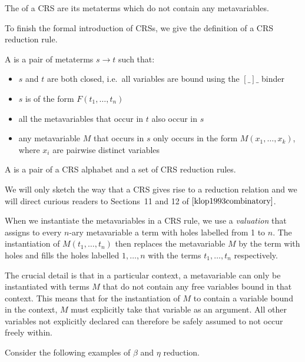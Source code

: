 \begin{definition}
  The  of a CRS are its metaterms which do not contain any
  metavariables.
\end{definition}

To finish the formal introduction of CRSs, we give the definition of a CRS
reduction rule.

\begin{definition}
  A  is a pair of metaterms $s \to t$ such that:
  \begin{itemize}
  \item $s$ and $t$ are both closed, i.e.\ all variables are bound using
    the $[\_]\_$ binder
  \item $s$ is of the form $F(t_1,\ldots,t_n)$
  \item all the metavariables that occur in $t$ also occur in $s$
  \item any metavariable $M$ that occurs in $s$ only occurs in the form
    $M(x_1,\ldots,x_k)$, where $x_i$ are pairwise distinct variables
  \end{itemize}
\end{definition}

\begin{definition}
  A  is a pair of a CRS alphabet
  and a set of CRS reduction rules.
\end{definition}

We will only sketch the way that a CRS gives rise to a reduction relation
and we will direct curious readers to Sections~11 and 12 of
$\cite{klop1993combinatory}$.

When we instantiate the metavariables in a CRS rule, we use a
\emph{valuation} that assigns to every $n$-ary metavariable a term with
holes labelled from 1 to $n$. The instantiation of $M(t_1,\ldots,t_n)$ then
replaces the metavariable $M$ by the term with holes and fills the holes
labelled $1,\ldots,n$ with the terms $t_1,\ldots,t_n$ respectively.

The crucial detail is that in a particular context, a metavariable can only
be instantiated with terms $M$ that do not contain any free variables bound
in that context. This means that for the instantiation of $M$ to contain a
variable bound in the context, $M$ must explicitly take that variable as an
argument. All other variables not explicitly declared can therefore be
safely assumed to not occur freely within.

Consider the following examples of $\beta$ and $\eta$ reduction.

